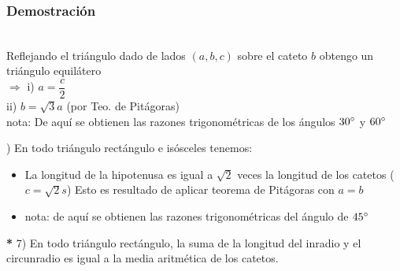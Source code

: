 \subsubsection{Demostración}
\begin{multicols}{2}
\columnbreak\\
\noindent Reflejando el triángulo dado de lados $(a,b,c)$ sobre el cateto $b$ obtengo un triángulo equilátero\\
$\Longrightarrow$ i) $a = \dfrac{c}{2}$\\
\hspace*{0.7cm}ii) $b = \sqrt{3}a$ (por Teo. de Pitágoras)\\

\noindent nota: De aquí se obtienen las razones trigonométricas de los ángulos $30\degree$ y $60\degree$
\end{multicols} 


) En todo triángulo rectángulo e isósceles tenemos:
\begin{itemize}
    \item[] La longitud de la hipotenusa es igual a $\sqrt{2}$ veces la longitud de los catetos ($c = \sqrt{2}s$) Esto es resultado de aplicar teorema de Pitágoras con $a=b$
    \item[] nota: de aquí se obtienen las razones trigonométricas del ángulo de $45\degree$
\end{itemize}


\noindent\textbf{*} 7) En todo triángulo rectángulo, la suma de la longitud del inradio y el circunradio es igual a la media aritmética de los catetos.

